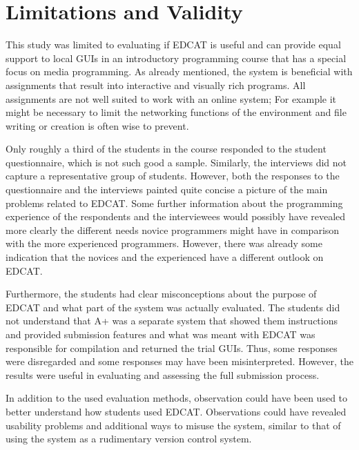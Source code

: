 \section{Limitations and Validity}
\label{section:limitations}

This study was limited to evaluating if EDCAT is useful and can provide equal support to local GUIs in an introductory programming course that has a special focus on media programming. As already mentioned, the system is beneficial with assignments that result into interactive and visually rich programs. All assignments are not well suited to work with an online system; For example it might be necessary to limit the networking functions of the environment and file writing or creation is often wise to prevent. 

Only roughly a third of the students in the course responded to the student questionnaire, which is not such good a sample. Similarly, the interviews did not capture a representative group of students. However, both the responses to the questionnaire and the interviews painted quite concise a picture of the main problems related to EDCAT. Some further information about the programming experience of the respondents and the interviewees would possibly have revealed more clearly the different needs novice programmers might have in comparison with the more experienced programmers. However, there was already some indication that the novices and the experienced have a different outlook on EDCAT.

Furthermore, the students had clear misconceptions about the purpose of EDCAT and what part of the system was actually evaluated. The students did not understand that A+ was a separate system that showed them instructions and provided submission features and what was meant with EDCAT was responsible for compilation and returned the trial GUIs. Thus, some responses were disregarded and some responses may have been misinterpreted. However, the results were useful in evaluating and assessing the full submission process.

In addition to the used evaluation methods, observation could have been used to better understand how students used EDCAT. Observations could have revealed usability problems and additional ways to misuse the system, similar to that of using the system as a rudimentary version control system.
